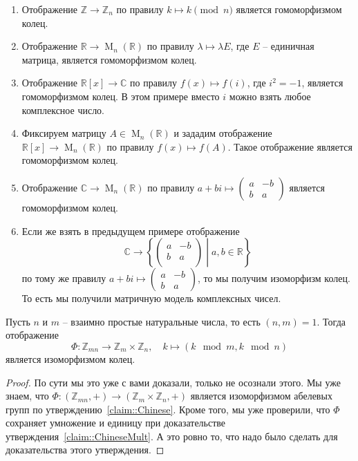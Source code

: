 \begin{examples}
\begin{enumerate}
\item Отображение  $\mathbb Z\to \mathbb Z_n$ по правилу $k\mapsto k \pmod n$ является гомоморфизмом колец.

\item Отображение $\mathbb R\to \operatorname{M}_n(\mathbb R)$ по правилу $\lambda \mapsto \lambda E$, где $E$ -- единичная матрица, является гомоморфизмом колец.

\item Отображение $\mathbb R[x]\to \mathbb C$ по правилу $f(x) \mapsto f(i)$, где $i^2 = -1$, является гомоморфизмом колец.
В этом примере вместо $i$ можно взять любое комплексное число.

\item Фиксируем матрицу $A \in \operatorname{M}_n(\mathbb R)$ и зададим отображение $\mathbb R[x]\to \operatorname{M}_n(\mathbb R)$  по правилу $f(x) \mapsto f(A)$.
Такое отображение является гомоморфизмом колец.

\item Отображение $\mathbb C\to \operatorname{M}_n(\mathbb R)$ по правилу $a + bi \mapsto \left(\begin{smallmatrix}{a}&{-b}\\{b}&{a}\end{smallmatrix}\right)$ является гомоморфизмом колец.

\item Если же взять в предыдущем примере отображение
\[
\mathbb C\to
\left\{
\left.
\begin{pmatrix}
{a}&{-b}\\
{b}&{a}\\
\end{pmatrix}
\;
\right|
\;
a,b\in \mathbb R
\right\}
\]
по тому же правилу $a + bi \mapsto \left(\begin{smallmatrix}{a}&{-b}\\{b}&{a}\end{smallmatrix}\right)$, то мы получим изоморфизм колец.
То есть мы получили матричную модель комплексных чисел.

\end{enumerate}
\end{examples}


\begin{claim}
Пусть $n$ и $m$ -- взаимно простые натуральные числа, то есть $(n,m) = 1$.
Тогда отображение
\[
\Phi \colon \mathbb Z_{mn} \to \mathbb Z_m \times \mathbb Z_n,\quad k\mapsto (k\!\!\mod m, k\!\!\mod n)
\]
является изоморфизмом колец.
\end{claim}
\begin{proof}
По сути мы это уже с вами доказали, только не осознали этого.
Мы уже знаем, что $\Phi\colon (\mathbb Z_{mn}, +) \to (\mathbb Z_m\times\mathbb Z_n, +)$ является изоморфизмом абелевых групп по утверждению~\ref{claim::Chinese}.
Кроме того, мы уже проверили, что $\Phi$ сохраняет умножение и единицу при доказательстве утверждения~\ref{claim::ChineseMult}.
А это ровно то, что надо было сделать для доказательства этого утверждения.
\end{proof}

